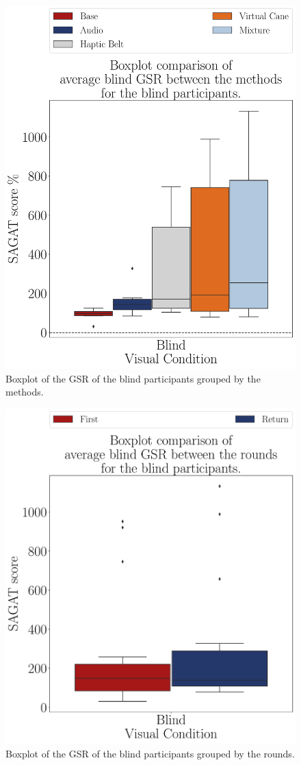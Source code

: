 \begin{figure}[!htb]
    \centering
    \includegraphics[width = 0.75\linewidth]{Resultados/GSR/Figuras/pdf/boxplot_gsr_avg_blind_scene.pdf}
    \caption{Boxplot of the GSR of the blind participants grouped by the methods.}
    \label{fig:boxplot_gsr_avg_blind_scene}
\end{figure}
\begin{figure}[!htb]
    \centering
    \includegraphics[width = 0.75\linewidth]{Resultados/GSR/Figuras/pdf/boxplot_gsr_avg_blind_rounds.pdf}
    \caption{Boxplot of the GSR of the blind participants grouped by the rounds.}
    \label{fig:boxplot_gsr_avg_blind_rounds}
\end{figure}


